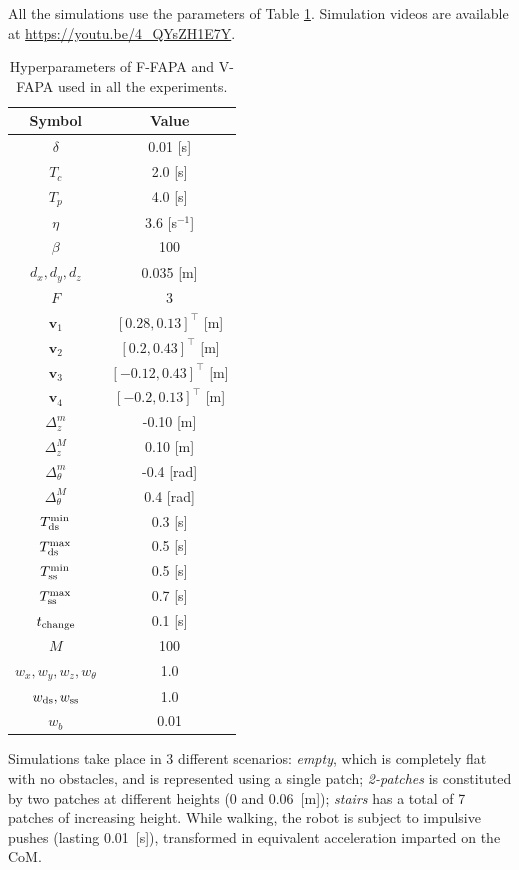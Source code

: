 All the simulations use the parameters of Table \ref{tab:FAPA:hyperparameters}.
Simulation videos are available at \url{https://youtu.be/4_QYsZH1E7Y}.

\begin{table}
    \centering
    \begin{tabular}{ |c|c| } 
        \hline
        Symbol & Value \\
        \hline
        $\delta$ & 0.01 [s] \\
        $T_c$ & 2.0 [s] \\
        $T_p$ & 4.0 [s] \\
        $\eta$ & 3.6 [s$^{-1}$] \\
        $\beta$ & 100 \\
        $d_x, d_y, d_z$ & 0.035 [m] \\
        $F$ & 3 \\
        $\bm{v}_1$ & $[0.28, 0.13]^\top $ [m] \\
        $\bm{v}_2$ & $[0.2, 0.43]^\top$ [m] \\
        $\bm{v}_3$ & $[-0.12, 0.43]^\top$ [m] \\
        $\bm{v}_4$ & $[-0.2, 0.13]^\top$ [m] \\
        $\Delta_z^m$ & -0.10 [m] \\
        $\Delta_z^M$ & 0.10 [m] \\
        $\Delta_{\theta}^m$ & -0.4 [rad] \\
        $\Delta_{\theta}^M$ & 0.4 [rad] \\
        $T_{\rm ds}^{\min}$ & 0.3 [s] \\
        $T_{\rm ds}^{\max}$ & 0.5 [s] \\
        $T_{\rm ss}^{\min}$ & 0.5 [s] \\
        $T_{\rm ss}^{\max}$ & 0.7 [s] \\
        $t_{\rm change}$ & 0.1 [s] \\
        $M$ & 100 \\
        $w_x, w_y, w_z, w_{\theta}$ & 1.0 \\
        $w_{\rm ds}, w_{\rm ss}$ & 1.0 \\
        $w_b$ & 0.01 \\
        \hline
    \end{tabular}
    \caption{Hyperparameters of F-FAPA and V-FAPA used in all the experiments.}
    \label{tab:FAPA:hyperparameters}
\end{table}

Simulations take place in 3 different scenarios: {\em empty}, which is
completely flat with no obstacles, and is represented using a single patch;
{\em 2-patches} is constituted by two patches at different heights
(0 and 0.06~[m]); {\em stairs} has a total of 7 patches of increasing height.
While walking, the robot is subject to impulsive pushes (lasting 0.01~[s]),
transformed in equivalent acceleration imparted on the CoM.

